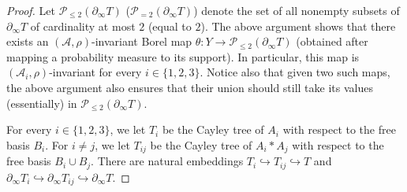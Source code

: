 \documentclass[JEP,XML,SOM,Unicode,NoFloatCountersInSection,published]{cedram}
\let\mathcal\mathscr
\theoremstyle{plain}
\theoremstyle{definition}
\newcommand{\cala}{\mathcal{A}}
\newcommand{\calp}{\mathcal{P}}
\begin{document}
\begin{proof}
Let $\calp_{\le 2}(\partial_\infty T)$ (\resp $\calp_{=2}(\partial_\infty T)$) denote the set of all nonempty subsets of $\partial_\infty T$ of cardinality at most $2$ (\resp equal to $2$). The above argument shows that there exists an $(\cala,\rho)$-invariant Borel map $\theta:Y\to\calp_{\le 2}(\partial_\infty T)$ (obtained after mapping a probability measure to its support). In particular, this map is $(\cala_i,\rho)$-invariant for every $i\in\{1,2,3\}$. Notice also that given two such maps, the above argument also ensures that their union should still take its values (essentially) in $\calp_{\le 2}(\partial_\infty T)$.

For every $i\in\{1,2,3\}$, we let $T_i$ be the Cayley tree of $A_i$ with respect to the free basis $B_i$. For $i\neq j$, we let $T_{ij}$ be the Cayley tree of $A_i\ast A_j$ with respect to the free basis $B_i\cup B_j$. There are natural embeddings $T_i\hookrightarrow T_{ij}\hookrightarrow T$ and $\partial_\infty T_i\hookrightarrow\partial_\infty T_{ij}\hookrightarrow \partial_\infty T$.


\end{proof}
\end{document}
